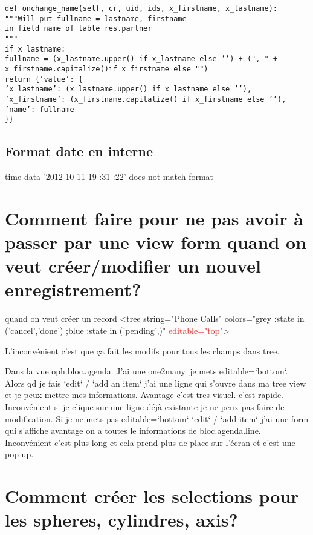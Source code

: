\documentclass[12pt,a4paper]{article}
\begin{document}
\begin{verbatim}
def onchange_name(self, cr, uid, ids, x_firstname, x_lastname):
"""Will put fullname = lastname, firstname
in field name of table res.partner
"""
if x_lastname:
fullname = (x_lastname.upper() if x_lastname else ’’) + (", " + x_firstname.capitalize()if x_firstname else "")
return {’value’: {
’x_lastname’: (x_lastname.upper() if x_lastname else ’’),
’x_firstname’: (x_firstname.capitalize() if x_firstname else ’’),
’name’: fullname
}}
\end{verbatim}


\subsection{Format date en interne}
\label{sec:interdateformat}


time data ’2012-10-11 19 :31 :22’ does not match format





\section{Comment faire pour ne pas avoir à passer par une view form quand on veut créer/modifier un nouvel enregistrement?}
\label{sec:editable}


quand on veut créer un record
<tree string="Phone Calls" colors="grey :state in (’cancel’,’done’) ;blue :state in (’pending’,)" \textcolor{red}{editable="top"}>

L'inconvénient c'est que ça fait les modifs pour tous les champs dans tree.

Dans la vue oph.bloc.agenda. J'ai une one2many. je mets editable=`bottom`. Alors
qd je fais `edit` / `add an item` j'ai une ligne qui s'ouvre dans ma tree view
et je peux mettre mes informations.
Avantage c'est tres visuel. c'est rapide.
Inconvénient si je clique sur une ligne déjà existante je ne peux pas faire de
modification.
Si je ne mets pas editable=`bottom` `edit` / `add item` j'ai une form qui
s'affiche 
avantage on a toutes le informations de bloc.agenda.line.
Inconvénient c'est plus long et cela prend plus de place sur l'écran et c'est
une pop up.


\section{Comment créer les selections pour les spheres, cylindres, axis?}
\label{sec:sel_sph}
\end{document}
